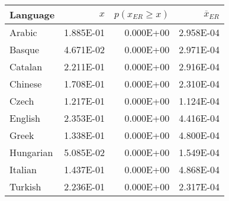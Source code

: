\begin{tabular}{lrrr}
\toprule
 Language   &       $x$ &   $p(x_{ER} \ge x)$ &   $\overline x_{ER}$ \\
\midrule
 Arabic     & \num{1.885E-01} &           \num{0.000E+00} &            \num{2.958E-04} \\
 Basque     & \num{4.671E-02} &           \num{0.000E+00} &            \num{2.971E-04} \\
 Catalan    & \num{2.211E-01} &           \num{0.000E+00} &            \num{2.916E-04} \\
 Chinese    & \num{1.708E-01} &           \num{0.000E+00} &            \num{2.310E-04} \\
 Czech      & \num{1.217E-01} &           \num{0.000E+00} &            \num{1.124E-04} \\
 English    & \num{2.353E-01} &           \num{0.000E+00} &            \num{4.416E-04} \\
 Greek      & \num{1.338E-01} &           \num{0.000E+00} &            \num{4.800E-04} \\
 Hungarian  & \num{5.085E-02} &           \num{0.000E+00} &            \num{1.549E-04} \\
 Italian    & \num{1.437E-01} &           \num{0.000E+00} &            \num{4.868E-04} \\
 Turkish    & \num{2.236E-01} &           \num{0.000E+00} &            \num{2.317E-04} \\
\bottomrule
\end{tabular}